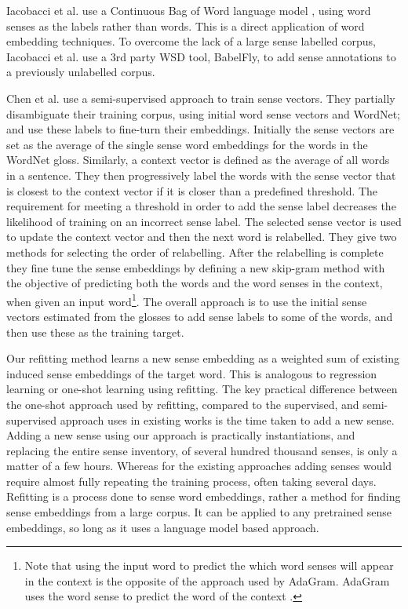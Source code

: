 \documentclass{sig-alternate}
\begin{document}
Iacobacci et al. \parencite{iacobacci2015sensembed} use a Continuous Bag of Word language model \parencite{mikolov2013efficient}, using word senses as the labels rather than words. This is a direct application of word embedding techniques. To overcome the lack of a large sense labelled corpus, Iacobacci et al. use a 3rd party WSD tool, BabelFly, to add sense annotations to a previously unlabelled corpus.

Chen et al. \parencite{Chen2014} use a semi-supervised approach to train sense vectors. They partially disambiguate their training corpus, using initial word sense vectors and WordNet; and use these labels to fine-turn their embeddings.
Initially the sense vectors are set as the average of the single sense word embeddings \parencite{mikolov2013efficient} for the words in the WordNet gloss.
Similarly, a context vector is defined as the average of all words in a sentence.
They then progressively label the words with the sense vector that is closest to the context vector if it is closer than a predefined threshold.
The requirement for meeting a threshold in order to add the sense label  decreases the likelihood of training on an incorrect sense label.
The selected sense vector is used to update the context vector and then the next word is relabelled. They give two methods for selecting the order of relabelling.
After the relabelling is complete they fine tune the sense embeddings by defining a new skip-gram method with the objective of predicting both the words and the word senses in the context, when given an input word\footnote{Note that using the input word to predict the which word senses will appear in the context is the opposite of the approach used by AdaGram. AdaGram uses the word sense to predict the word of the context \parencite{AdaGrams}.}. The overall approach is to use the initial sense vectors estimated from the glosses to add sense labels to some of the words, and then use these as the training target.


Our refitting method learns a new sense embedding as a weighted sum of existing induced sense embeddings of the target word.
This is analogous to regression learning or one-shot learning using refitting.
The key practical difference between the one-shot approach used by refitting, compared to the supervised, and semi-supervised approach uses in existing works is the time taken to  add a new sense.
Adding a new sense using our approach is practically instantiations, and replacing the entire sense inventory, of several hundred thousand senses, is only a matter of a few hours.
Whereas for the existing approaches adding senses would require almost fully repeating the training process, often taking several days.
Refitting is a process done to sense word embeddings, rather a method for finding sense embeddings from a large corpus. 
It can be applied to any pretrained sense embeddings, so long as it uses a language model based approach.
\end{document}
